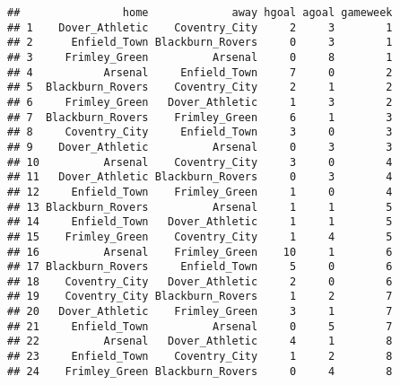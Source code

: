 \documentclass[]{article}
\begin{document}
\begin{verbatim}
##                home             away hgoal agoal gameweek
## 1    Dover_Athletic    Coventry_City     2     3        1
## 2      Enfield_Town Blackburn_Rovers     0     3        1
## 3     Frimley_Green          Arsenal     0     8        1
## 4           Arsenal     Enfield_Town     7     0        2
## 5  Blackburn_Rovers    Coventry_City     2     1        2
## 6     Frimley_Green   Dover_Athletic     1     3        2
## 7  Blackburn_Rovers    Frimley_Green     6     1        3
## 8     Coventry_City     Enfield_Town     3     0        3
## 9    Dover_Athletic          Arsenal     0     3        3
## 10          Arsenal    Coventry_City     3     0        4
## 11   Dover_Athletic Blackburn_Rovers     0     3        4
## 12     Enfield_Town    Frimley_Green     1     0        4
## 13 Blackburn_Rovers          Arsenal     1     1        5
## 14     Enfield_Town   Dover_Athletic     1     1        5
## 15    Frimley_Green    Coventry_City     1     4        5
## 16          Arsenal    Frimley_Green    10     1        6
## 17 Blackburn_Rovers     Enfield_Town     5     0        6
## 18    Coventry_City   Dover_Athletic     2     0        6
## 19    Coventry_City Blackburn_Rovers     1     2        7
## 20   Dover_Athletic    Frimley_Green     3     1        7
## 21     Enfield_Town          Arsenal     0     5        7
## 22          Arsenal   Dover_Athletic     4     1        8
## 23     Enfield_Town    Coventry_City     1     2        8
## 24    Frimley_Green Blackburn_Rovers     0     4        8
\end{verbatim}
\end{document}

